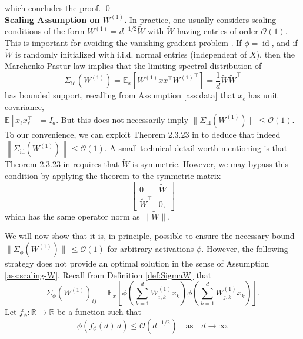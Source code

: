 \documentclass{article}
\begin{document}
which concludes the proof.
\qed
\bigskip
\bigskip
\\
\textbf{Scaling Assumption on $W^{(1)}$.} In practice, one usually considers scaling conditions of the form $W^{(1)}=d^{-1/2}\tilde{W}$ with $\tilde{W}$ having entries of order $\mathcal{O}(1)$. This is important for avoiding the vanishing gradient problem \cite{orvieto}. If $\phi=\operatorname{id}$, and if $\tilde{W}$ is randomly initialized with i.i.d. normal entries (independent of $X$), then the Marchenko-Pastur law implies that the limiting spectral distribution of
\begin{equation}
\Sigma_{\operatorname{id}}(W^{(1)})=\mathbb{E}_{x}[W^{(1)} x x^\top {W^{(1)}}^\top]=\frac{1}{d}\tilde{W}\tilde{W}^\top
\end{equation}
has bounded support, recalling from Assumption \ref{ass:data} that $x_\ell$ has unit covariance, 
\\ $\mathbb{E}[x_\ell x_\ell^\top]=I_d$. But this does not necessarily imply $\|\Sigma_{\operatorname{id}}(W^{(1)})\|\,\leq\mathcal{O}(1)$. To our convenience, we can exploit Theorem 2.3.23 in \cite{tao} to deduce that indeed $\left\|\Sigma_{\operatorname{id}}(W^{(1)})\right\|\leq\mathcal{O}(1)$. A small technical detail worth mentioning is that Theorem 2.3.23 in \cite{tao} requires that $\tilde{W}$ is symmetric. However, we may bypass this condition by applying the theorem to the symmetric matrix
\begin{equation}
\begin{bmatrix} 0 & \tilde{W} \\ \tilde{W}^\top & 0, \end{bmatrix}
\end{equation}
which has the same operator norm as $\|\tilde{W}\|$.
\par
We will now show that it is, in principle, possible to ensure the necessary bound $\|\Sigma_\phi(W^{(1)})\|\,\leq\mathcal{O}(1)$ for arbitrary activations $\phi$. However, the following strategy does not provide an optimal solution in the sense of Assumption \ref{ass:scaling-W}. Recall from Definition \ref{def:SigmaW} that
\begin{equation}
\Sigma_\phi(W^{(1)})_{ij}=\mathbb{E}_x\left[\phi\left(\sum_{k=1}^dW^{(1)}_{i,k}x_k\right)\phi\left(\sum_{k=1}^dW^{(1)}_{j,k}x_k\right)\right].
\end{equation}
Let $f_\phi:\mathbb{R}\to\mathbb{R}$ be a function such that \begin{equation}
\phi(f_\phi(d)\,d)\leq\mathcal{O}(d^{-1/2})\quad\text{as}\quad d\to\infty.\label{eq:scaling}
\end{equation}
\end{document}
